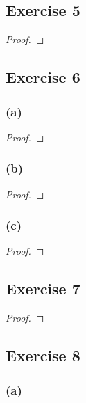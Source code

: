 \documentclass[14pt]{extarticle}
\begin{document}
\subsection{Exercise 5}

\begin{proof}

\end{proof}

\subsection{Exercise 6}

\subsubsection{(a)}

\begin{proof}

\end{proof}

\subsubsection{(b)}

\begin{proof}

\end{proof}

\subsubsection{(c)}

\begin{proof}

\end{proof}

\subsection{Exercise 7}

\begin{proof}

\end{proof}

\subsection{Exercise 8}

\subsubsection{(a)}
\end{document}
